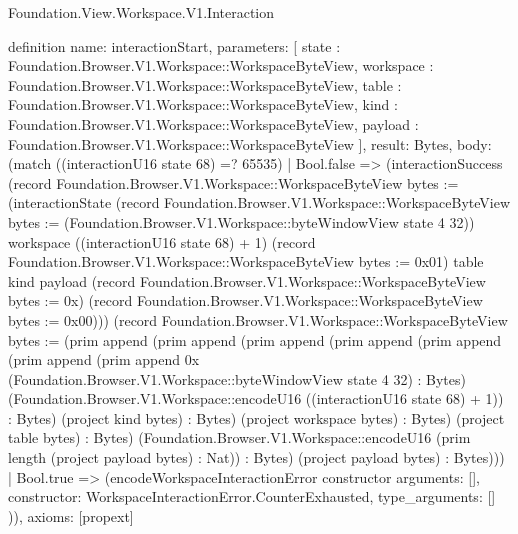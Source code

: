 \begin{lexlean}{Foundation.View.Workspace.V1.Interaction}
\begin{semanticmodule}
definition{
  name: interactionStart,
  parameters: [
    state : Foundation.Browser.V1.Workspace::WorkspaceByteView,
    workspace : Foundation.Browser.V1.Workspace::WorkspaceByteView,
    table : Foundation.Browser.V1.Workspace::WorkspaceByteView,
    kind : Foundation.Browser.V1.Workspace::WorkspaceByteView,
    payload : Foundation.Browser.V1.Workspace::WorkspaceByteView
  ],
  result: Bytes,
  body: (match ((interactionU16 state 68) =? 65535)
    | Bool.false => (interactionSuccess (record Foundation.Browser.V1.Workspace::WorkspaceByteView {bytes := (interactionState (record Foundation.Browser.V1.Workspace::WorkspaceByteView {bytes := (Foundation.Browser.V1.Workspace::byteWindowView state 4 32)}) workspace ((interactionU16 state 68) + 1) (record Foundation.Browser.V1.Workspace::WorkspaceByteView {bytes := 0x01}) table kind payload (record Foundation.Browser.V1.Workspace::WorkspaceByteView {bytes := 0x}) (record Foundation.Browser.V1.Workspace::WorkspaceByteView {bytes := 0x00}))}) (record Foundation.Browser.V1.Workspace::WorkspaceByteView {bytes := (prim append (prim append (prim append (prim append (prim append (prim append (prim append 0x (Foundation.Browser.V1.Workspace::byteWindowView state 4 32) : Bytes) (Foundation.Browser.V1.Workspace::encodeU16 ((interactionU16 state 68) + 1)) : Bytes) (project kind bytes) : Bytes) (project workspace bytes) : Bytes) (project table bytes) : Bytes) (Foundation.Browser.V1.Workspace::encodeU16 (prim length (project payload bytes) : Nat)) : Bytes) (project payload bytes) : Bytes)}))
    | Bool.true => (encodeWorkspaceInteractionError constructor{
      arguments: [],
      constructor: WorkspaceInteractionError.CounterExhausted,
      type_arguments: []
    })),
  axioms: [propext]
}


\end{semanticmodule}
\end{lexlean}
